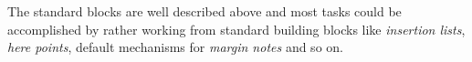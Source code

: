 The standard blocks are well described above and most tasks could be accomplished 
by rather working from
standard building blocks like \textit{insertion lists}, \textit{here points},
default mechanisms for \textit{margin notes} and so on.


%
%
%
%
%
%
%
%
%
%
%
